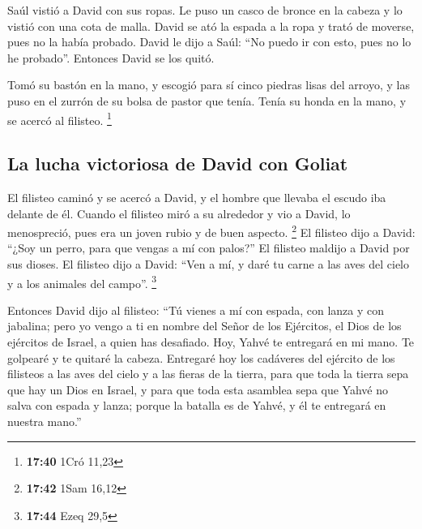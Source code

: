 \begin{paracol}{2}
 Saúl vistió a David con sus ropas. Le puso un casco de
bronce en la cabeza y lo vistió con una cota de malla. 
David se ató la espada a la ropa y trató de moverse, pues no la había
probado. David le dijo a Saúl: ``No puedo ir con esto, pues no lo he
probado''. Entonces David se los quitó.

 Tomó su bastón en la mano, y escogió para sí cinco
piedras lisas del arroyo, y las puso en el zurrón de su bolsa de pastor
que tenía. Tenía su honda en la mano, y se acercó al filisteo.
\footnote{\textbf{17:40} 1Cró 11,23}

\hypertarget{la-lucha-victoriosa-de-david-con-goliat}{%
\subsection{La lucha victoriosa de David con
Goliat}\label{la-lucha-victoriosa-de-david-con-goliat}}

 El filisteo caminó y se acercó a David, y el hombre que
llevaba el escudo iba delante de él.  Cuando el filisteo
miró a su alrededor y vio a David, lo menospreció, pues era un joven
rubio y de buen aspecto. \footnote{\textbf{17:42} 1Sam 16,12}
 El filisteo dijo a David: ``¿Soy un perro, para que
vengas a mí con palos?'' El filisteo maldijo a David por sus dioses.
 El filisteo dijo a David: ``Ven a mí, y daré tu carne a
las aves del cielo y a los animales del campo''. \footnote{\textbf{17:44}
  Ezeq 29,5}

 Entonces David dijo al filisteo: ``Tú vienes a mí con
espada, con lanza y con jabalina; pero yo vengo a ti en nombre del Señor
de los Ejércitos, el Dios de los ejércitos de Israel, a quien has
desafiado.  Hoy, Yahvé te entregará en mi mano. Te
golpearé y te quitaré la cabeza. Entregaré hoy los cadáveres del
ejército de los filisteos a las aves del cielo y a las fieras de la
tierra, para que toda la tierra sepa que hay un Dios en Israel,
 y para que toda esta asamblea sepa que Yahvé no salva
con espada y lanza; porque la batalla es de Yahvé, y él te entregará en
nuestra mano.''


\end{paracol}
